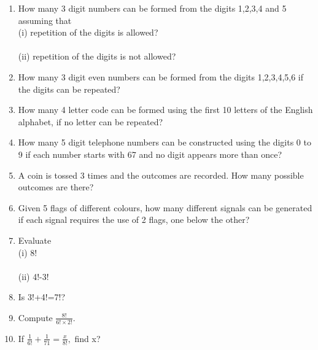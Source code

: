 \renewcommand{\theequation}{\theenumi}
\begin{enumerate}[label=\arabic*.,ref=\thesubsection.\theenumi]

\item How many 3 digit numbers can be formed from the digits 1,2,3,4 and 5 assuming that\\
(i) repetition of the digits is allowed?\\
\\(ii) repetition of the digits is not allowed?\\

\item How many 3 digit even numbers can be formed from the digits 1,2,3,4,5,6 if the digits can be repeated?\\

\item How many 4 letter code can be formed using the first 10 letters of the English alphabet, if no letter can be repeated?\\

\item How many 5 digit telephone numbers can be constructed using the digits 0 to 9 if each number starts with 67 and no digit appears more than once?\\

\item A coin is tossed 3 times and the outcomes are recorded. How many possible outcomes are there?\\

\item Given 5 flags of different colours, how many different signals can be generated if each signal requires the use of 2 flags, one below the other?\\

\item Evaluate\\
(i) 8!\\
\\(ii) 4!-3!\\

\item Is 3!+4!=7!?\\

\item Compute $\frac{8!}{6! \times 2!}.$\\

\item If $\frac{1}{6!} + \frac{1}{71} = \frac{x}{8!},$ find x?\\


\end{enumerate}
